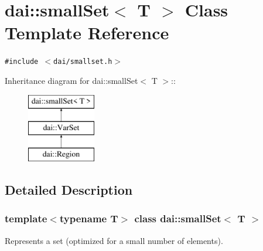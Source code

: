 \hypertarget{classdai_1_1smallSet}{
\section{dai::smallSet$<$ T $>$ Class Template Reference}
\label{classdai_1_1smallSet}
}
{\tt \#include $<$dai/smallset.h$>$}

Inheritance diagram for dai::smallSet$<$ T $>$::\begin{figure}[H]
\begin{center}
\leavevmode
\includegraphics[height=3cm]{classdai_1_1smallSet}
\end{center}
\end{figure}


\subsection{Detailed Description}
\subsubsection*{template$<$typename T$>$ class dai::smallSet$<$ T $>$}

Represents a set (optimized for a small number of elements). 

